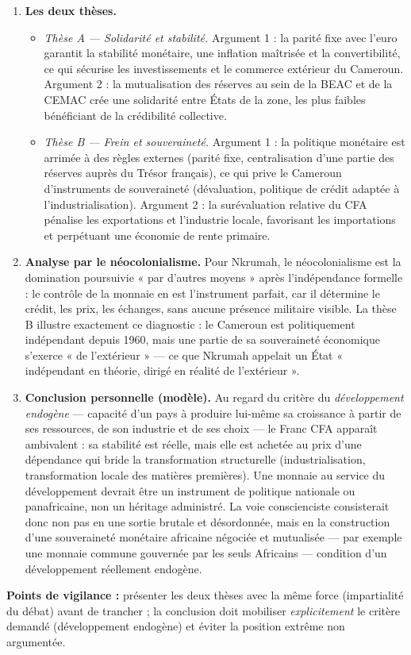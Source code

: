 \documentclass[11pt]{article}
\begin{document}
\begin{corrige}
\begin{enumerate}
\item \textbf{Les deux thèses.}
\begin{itemize}
\item \emph{Thèse A — Solidarité et stabilité.} Argument 1 : la parité fixe avec l'euro garantit la stabilité monétaire, une inflation maîtrisée et la convertibilité, ce qui sécurise les investissements et le commerce extérieur du Cameroun. Argument 2 : la mutualisation des réserves au sein de la BEAC et de la CEMAC crée une solidarité entre États de la zone, les plus faibles bénéficiant de la crédibilité collective.
\item \emph{Thèse B — Frein et souveraineté.} Argument 1 : la politique monétaire est arrimée à des règles externes (parité fixe, centralisation d'une partie des réserves auprès du Trésor français), ce qui prive le Cameroun d'instruments de souveraineté (dévaluation, politique de crédit adaptée à l'industrialisation). Argument 2 : la surévaluation relative du CFA pénalise les exportations et l'industrie locale, favorisant les importations et perpétuant une économie de rente primaire.
\end{itemize}
\item \textbf{Analyse par le néocolonialisme.} Pour Nkrumah, le néocolonialisme est la domination poursuivie « par d'autres moyens » après l'indépendance formelle : le contrôle de la monnaie en est l'instrument parfait, car il détermine le crédit, les prix, les échanges, sans aucune présence militaire visible. La thèse B illustre exactement ce diagnostic : le Cameroun est politiquement indépendant depuis 1960, mais une partie de sa souveraineté économique s'exerce « de l'extérieur » — ce que Nkrumah appelait un État « indépendant en théorie, dirigé en réalité de l'extérieur ».
\item \textbf{Conclusion personnelle (modèle).} Au regard du critère du \emph{développement endogène} — capacité d'un pays à produire lui-même sa croissance à partir de ses ressources, de son industrie et de ses choix — le Franc CFA apparaît ambivalent : sa stabilité est réelle, mais elle est achetée au prix d'une dépendance qui bride la transformation structurelle (industrialisation, transformation locale des matières premières). Une monnaie au service du développement devrait être un instrument de politique nationale ou panafricaine, non un héritage administré. La voie conscienciste consisterait donc non pas en une sortie brutale et désordonnée, mais en la construction d'une souveraineté monétaire africaine négociée et mutualisée — par exemple une monnaie commune gouvernée par les seuls Africains — condition d'un développement réellement endogène.
\end{enumerate}

\textbf{Points de vigilance :} présenter les deux thèses avec la même force (impartialité du débat) avant de trancher ; la conclusion doit mobiliser \emph{explicitement} le critère demandé (développement endogène) et éviter la position extrême non argumentée.
\end{corrige}
\end{document}
